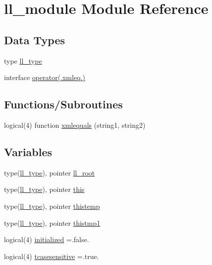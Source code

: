 \hypertarget{namespacell__module}{}\section{ll\+\_\+module Module Reference}
\label{namespacell__module}
\subsection*{Data Types}
\begin{DoxyCompactItemize}
\item 
type \hyperlink{structll__module_1_1ll__type}{ll\+\_\+type}
\item 
interface \hyperlink{interfacell__module_1_1operator_07_8xmleq_8_08}{operator(.\+xmleq.)}
\end{DoxyCompactItemize}
\subsection*{Functions/\+Subroutines}
\begin{DoxyCompactItemize}
\item 
logical(4) function \hyperlink{namespacell__module_a974bd171cab1f518654379cd52246d25}{xmlequals} (string1, string2)
\end{DoxyCompactItemize}
\subsection*{Variables}
\begin{DoxyCompactItemize}
\item 
type(\hyperlink{structll__module_1_1ll__type}{ll\+\_\+type}), pointer \hyperlink{namespacell__module_a5db1c240e6150f92ef1d67eaf85eef32}{ll\+\_\+root}
\item 
type(\hyperlink{structll__module_1_1ll__type}{ll\+\_\+type}), pointer \hyperlink{namespacell__module_a783da1e4daa9a59c867f3b4c7bcc4c40}{this}
\item 
type(\hyperlink{structll__module_1_1ll__type}{ll\+\_\+type}), pointer \hyperlink{namespacell__module_abbd7e613a1a01cdf243759df306a5c74}{thistemp}
\item 
type(\hyperlink{structll__module_1_1ll__type}{ll\+\_\+type}), pointer \hyperlink{namespacell__module_adff084d143c069989dfc42f647ae5d4a}{thistmp1}
\item 
logical(4) \hyperlink{namespacell__module_ae0a96b836378f392f389fe10174abc92}{initialized} =.false.
\item 
logical(4) \hyperlink{namespacell__module_a162ab75decc0d5fc590e2bebe645c50f}{tcasesensitive} =.true.
\end{DoxyCompactItemize}


